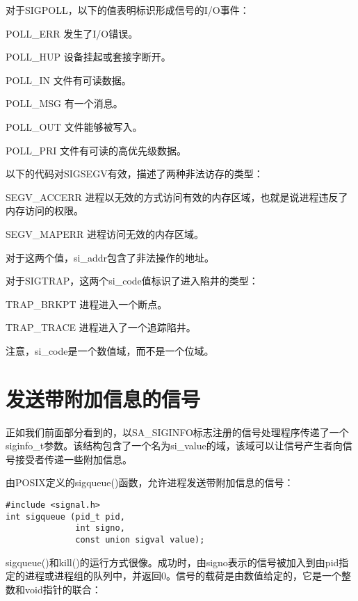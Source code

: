 对于SIGPOLL，以下的值表明标识形成信号的I/O事件：

\begin{eqlist*}
\item[POLL\_ERR] 发生了I/O错误。
\item[POLL\_HUP] 设备挂起或套接字断开。
\item[POLL\_IN] 文件有可读数据。
\item[POLL\_MSG] 有一个消息。
\item[POLL\_OUT] 文件能够被写入。
\item[POLL\_PRI] 文件有可读的高优先级数据。
\end{eqlist*}

以下的代码对SIGSEGV有效，描述了两种非法访存的类型：

\begin{eqlist*}
\item[SEGV\_ACCERR] 进程以无效的方式访问有效的内存区域，也就是说进程违反了内存访问的权限。
\item[SEGV\_MAPERR] 进程访问无效的内存区域。
\end{eqlist*}

对于这两个值，si\_addr包含了非法操作的地址。

对于SIGTRAP，这两个si\_code值标识了进入陷井的类型：

\begin{eqlist*}
\item[TRAP\_BRKPT] 进程进入一个断点。
\item[TRAP\_TRACE] 进程进入了一个追踪陷井。
\end{eqlist*}

注意，si\_code是一个数值域，而不是一个位域。

\section{发送带附加信息的信号}

正如我们前面部分看到的，以SA\_SIGINFO标志注册的信号处理程序传递了一个siginfo\_t参数。该结构包含了一个名为si\_value的域，该域可以让信号产生者向信号接受者传递一些附加信息。

由POSIX定义的sigqueue()函数，允许进程发送带附加信息的信号：

\begin{lstlisting}
#include <signal.h>
int sigqueue (pid_t pid,
              int signo,
              const union sigval value);
\end{lstlisting}

sigqueue()和kill()的运行方式很像。成功时，由signo表示的信号被加入到由pid指定的进程或进程组的队列中，并返回0。信号的载荷是由数值给定的，它是一个整数和void指针的联合：


